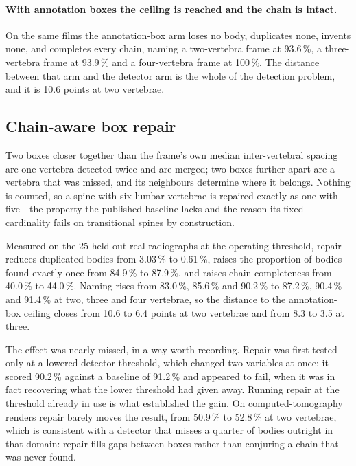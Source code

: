 \documentclass[11pt,letterpaper]{article}
\begin{document}
\paragraph{With annotation boxes the ceiling is reached and the chain is intact.} On the same films the annotation-box arm loses no body, duplicates none, invents none, and completes every chain, naming a two-vertebra frame at 93.6\,\%, a three-vertebra frame at 93.9\,\% and a four-vertebra frame at 100\,\%. The distance between that arm and the detector arm is the whole of the detection problem, and it is 10.6 points at two vertebrae.

\subsection*{Chain-aware box repair}
Two boxes closer together than the frame's own median inter-vertebral spacing are one vertebra detected twice and are merged; two boxes further apart are a vertebra that was missed, and its neighbours determine where it belongs. Nothing is counted, so a spine with six lumbar vertebrae is repaired exactly as one with five---the property the published baseline lacks and the reason its fixed cardinality fails on transitional spines by construction.

Measured on the 25 held-out real radiographs at the operating threshold, repair reduces duplicated bodies from 3.03\,\% to 0.61\,\%, raises the proportion of bodies found exactly once from 84.9\,\% to 87.9\,\%, and raises chain completeness from 40.0\,\% to 44.0\,\%. Naming rises from 83.0\,\%, 85.6\,\% and 90.2\,\% to 87.2\,\%, 90.4\,\% and 91.4\,\% at two, three and four vertebrae, so the distance to the annotation-box ceiling closes from 10.6 to 6.4 points at two vertebrae and from 8.3 to 3.5 at three.

The effect was nearly missed, in a way worth recording. Repair was first tested only at a lowered detector threshold, which changed two variables at once: it scored 90.2\,\% against a baseline of 91.2\,\% and appeared to fail, when it was in fact recovering what the lower threshold had given away. Running repair at the threshold already in use is what established the gain. On computed-tomography renders repair barely moves the result, from 50.9\,\% to 52.8\,\% at two vertebrae, which is consistent with a detector that misses a quarter of bodies outright in that domain: repair fills gaps between boxes rather than conjuring a chain that was never found.
\end{document}
